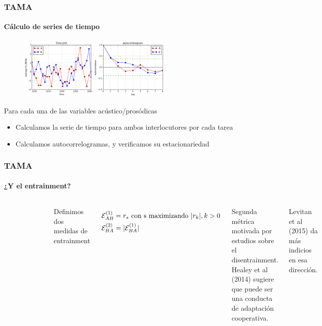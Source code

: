 \begin{frame}
\frametitle{TAMA}
\framesubtitle{Cálculo de series de tiempo}

\begin{figure}
\centering
\includegraphics[height=3cm]{images/time_plot_with_autocorrelation.png}
\end{figure}



Para cada una de las variables acústico/prosódicas

\begin{itemize}
  \item Calculamos la serie de tiempo para ambos interlocutores por cada tarea
  \item Calculamos autocorrelogramas, y verificamos su estacionariedad
\end{itemize}
\end{frame}

\begin{frame}
\frametitle{TAMA}
\framesubtitle{¿Y el entrainment?}

  \begin{columns}
    \begin{figure}[t]
      \includegraphics[scale=0.33]{images/cross_correlogram_2.png}
    \end{figure}

    Definimos dos medidas de entrainment

    \begin{align*}
      \mathcal{E}_{AB}^{(1)} &= r_s \text{ con s maximizando } |r_k|,  k > 0  \\
      \mathcal{E}_{BA}^{(2)} &= |\mathcal{E}_{BA}^{(1)}|
    \end{align*}

    Segunda métrica motivada por estudios sobre el disentrainment. Healey et al (2014) sugiere que puede ser una conducta de adaptación cooperativa.

    Levitan et al (2015) da más indicios en esa dirección.
  \end{columns}
\end{frame}

